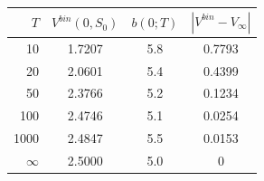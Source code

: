 \begin{tabular}{rccc}
\toprule
$T$ & $V^{bin}(0,S_0)$ & $b(0;T)$ & $|V^{bin}-V_\infty|$ \\
\midrule
10 & 1.7207 & 5.8 & 0.7793 \\
20 & 2.0601 & 5.4 & 0.4399 \\
50 & 2.3766 & 5.2 & 0.1234 \\
100 & 2.4746 & 5.1 & 0.0254 \\
1000 & 2.4847 & 5.5 & 0.0153 \\
$\infty$ & 2.5000 & 5.0 & 0 \\
\bottomrule
\end{tabular}
